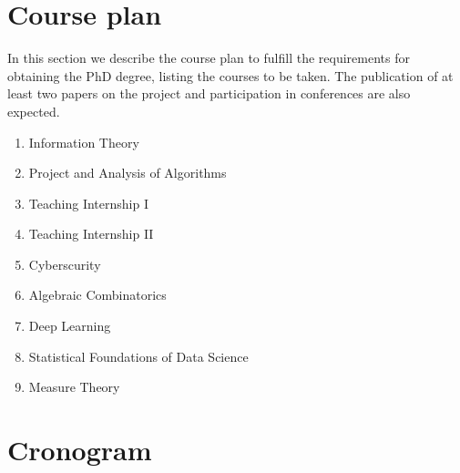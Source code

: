 \documentclass[12pt]{article}
\begin{document}
\section{Course plan}
In this section we describe the course plan to fulfill the requirements for obtaining the PhD degree, listing the courses to be taken. The publication of at least two papers on the project and participation in conferences are also expected.

\begin{enumerate}
\item Information Theory
\item Project and Analysis of Algorithms
\item Teaching Internship I
\item Teaching Internship II
\item Cyberscurity 
\item Algebraic Combinatorics
\item Deep Learning
\item Statistical Foundations of Data Science
\item Measure Theory
\end{enumerate}

\section{Cronogram}
\end{document}
